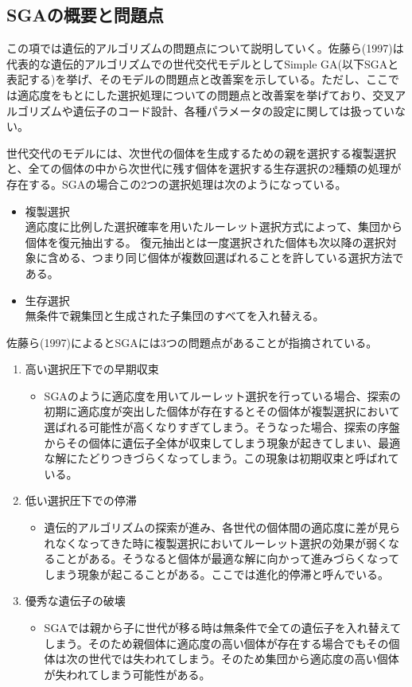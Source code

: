 
\subsection{SGAの概要と問題点}
この項では遺伝的アルゴリズムの問題点について説明していく。佐藤ら(1997)は代表的な遺伝的アルゴリズムでの世代交代モデルとしてSimple GA(以下SGAと表記する)を挙げ、そのモデルの問題点と改善案を示している。ただし、ここでは適応度をもとにした選択処理についての問題点と改善案を挙げており、交叉アルゴリズムや遺伝子のコード設計、各種パラメータの設定に関しては扱っていない。

世代交代のモデルには、次世代の個体を生成するための親を選択する複製選択と、全ての個体の中から次世代に残す個体を選択する生存選択の2種類の処理が存在する。SGAの場合この2つの選択処理は次のようになっている。

\begin{itemize}
\item{複製選択}\\
適応度に比例した選択確率を用いたルーレット選択方式によって、集団から個体を復元抽出する。
復元抽出とは一度選択された個体も次以降の選択対象に含める、つまり同じ個体が複数回選ばれることを許している選択方法である。
\item{生存選択}\\
無条件で親集団と生成された子集団のすべてを入れ替える。
\end{itemize}

佐藤ら(1997)によるとSGAには3つの問題点があることが指摘されている。
\begin{enumerate}
\item{高い選択圧下での早期収束}
\begin{itemize}
\item{SGAのように適応度を用いてルーレット選択を行っている場合、探索の初期に適応度が突出した個体が存在するとその個体が複製選択において選ばれる可能性が高くなりすぎてしまう。そうなった場合、探索の序盤からその個体に遺伝子全体が収束してしまう現象が起きてしまい、最適な解にたどりつきづらくなってしまう。この現象は初期収束と呼ばれている。}
\end{itemize}
\item{低い選択圧下での停滞}
\begin{itemize}
\item{遺伝的アルゴリズムの探索が進み、各世代の個体間の適応度に差が見られなくなってきた時に複製選択においてルーレット選択の効果が弱くなることがある。そうなると個体が最適な解に向かって進みづらくなってしまう現象が起こることがある。ここでは進化的停滞と呼んでいる。}
\end{itemize}
\item{優秀な遺伝子の破壊}
\begin{itemize}
\item{SGAでは親から子に世代が移る時は無条件で全ての遺伝子を入れ替えてしまう。そのため親個体に適応度の高い個体が存在する場合でもその個体は次の世代では失われてしまう。そのため集団から適応度の高い個体が失われてしまう可能性がある。}
\end{itemize}
\end{enumerate}


